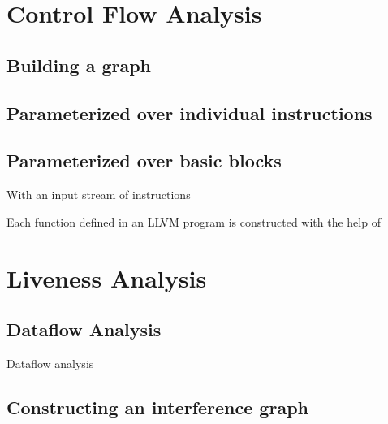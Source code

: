 \documentclass{article}
\begin{document}
\section{Control Flow Analysis}

\subsection{Building a graph}

\subsection{Parameterized over individual instructions}

\subsection{Parameterized over basic blocks}


With an input stream of instructions 


Each function defined in an LLVM program is constructed with the help of

\section{Liveness Analysis}

\subsection{Dataflow Analysis}

Dataflow analysis 

\subsection{Constructing an interference graph}




\end{document}
